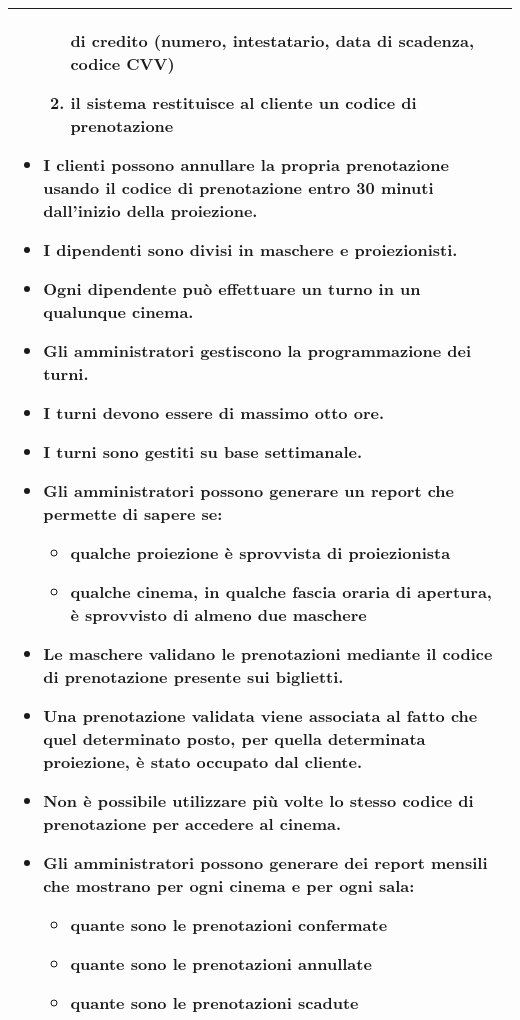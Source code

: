 \begin{tabularx}{\linewidth}{|X|}
\begin{itemize}
\begin{enumerate}
                        di credito (numero, intestatario, data di scadenza,
                        codice CVV)
                  \item il sistema restituisce al cliente un codice di
                        prenotazione
              \end{enumerate}
        \item I clienti possono annullare la propria prenotazione usando il
              codice di prenotazione entro 30 minuti dall'inizio della
              proiezione.
        \item I dipendenti sono divisi in maschere e proiezionisti.
        \item Ogni dipendente può effettuare un turno in un qualunque cinema.
        \item Gli amministratori gestiscono la programmazione dei turni.
        \item I turni devono essere di massimo otto ore.
        \item I turni sono gestiti su base settimanale.
        \item Gli amministratori possono generare un report che permette di
              sapere se:
              \begin{itemize}
                  \item qualche proiezione è sprovvista di proiezionista
                  \item qualche cinema, in qualche fascia oraria di apertura,
                        è sprovvisto di almeno due maschere
              \end{itemize}
        \item Le maschere validano le prenotazioni mediante il codice
              di prenotazione presente sui biglietti.
        \item Una prenotazione validata viene associata al fatto che quel
              determinato posto, per quella determinata proiezione,
              è stato occupato dal cliente.
        \item Non è possibile utilizzare più volte lo stesso codice di
              prenotazione per accedere al cinema.
        \item Gli amministratori possono generare dei report mensili che
              mostrano per ogni cinema e per ogni sala:
              \begin{itemize}
                  \item quante sono le prenotazioni confermate
                  \item quante sono le prenotazioni annullate
                  \item quante sono le prenotazioni scadute
              \end{itemize}
    \end{itemize}
    \\\hline
\end{tabularx}

